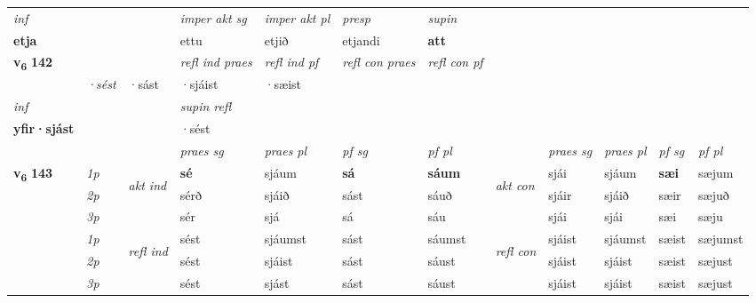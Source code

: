 \begin{longtable}[l]{X>{\footnotesize\itshape}llXXXXlXXXX}
   {\textit{inf}} & &  & \textit{imper akt sg} & \textit{imper akt pl}   & \textit{presp} & \textit{supin}   \\*
  {\textbf{etja}} & && ettu  & etjið   & etjandi &  \textbf{att}   \\*

\midrule

\multirow{2}{*}{{{\textbf{v{\textsubscript{6}}} \Large{\textbf{142}}}}}  & &&\textit{refl ind praes} & \textit{refl ind pf} & \textit{refl con praes} & \textit{refl con pf} \\*
\multicolumn{3}{r}{\textit{e-m}}& ·sést & ·sást & ·sjáist & ·sæist \\*

\cmidrule{4-7}
   {\textit{inf}} & &       & \textit{supin refl}  \\*
  {\textbf{yfir\allowbreak ·sjást}} & &       & ·sést  \\*

\midrule

 & &   & \textit{praes sg}  & \textit{praes pl}    & \textit{ pf sg} & \textit{pf pl} & & \textit{praes sg}  & \textit{praes pl}    & \textit{pf sg} & \textit{pf pl }  \\ \cmidrule{4-7} \cmidrule{9-12}
 \multirow{2}{*}{{{\textbf{v{\textsubscript{6}}} \Large{\textbf{143}}}}}  & 1p & \multirow{3}{*}{\begin{turn}{90}\textit{akt ind}\end{turn}} & \textbf{sé} & sjáum & \textbf{sá} & \textbf{sáum} & \multirow{3}{*}{\begin{turn}{90}\textit{akt con}\end{turn}} &sjái & sjáum & \textbf{sæi} & sæjum\\*
 & 2p &  &  sérð  & sjáið & sást & sáuð & & sjáir & sjáið & sæir & sæjuð \\*
 & 3p &  & sér & sjá & sá & sáu & & sjái & sjái& sæi & sæju \\*
\cmidrule{4-7} \cmidrule{9-12}
 & 1p & \multirow{3}{*}{\begin{turn}{90}\textit{refl ind}\end{turn}}  & sést & sjáumst & sást & sáumst & \multirow{3}{*}{\begin{turn}{90}\textit{refl con}\end{turn}}  &sjáist & sjáumst & sæist & sæjumst \\*
 & 2p &  & sést & sjáist & sást & sáust & &sjáist & sjáist & sæist & sæjust \\*
 & 3p  & & sést & sjást & sást & sáust & & sjáist & sjáist& sæist & sæjust \\*
\cmidrule{4-7} \cmidrule{9-12}


\end{longtable}
